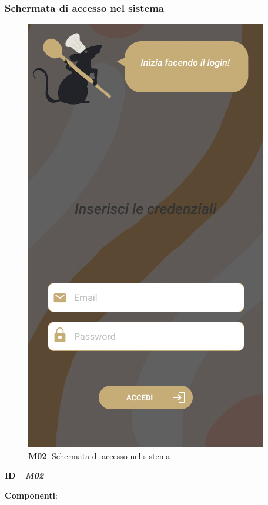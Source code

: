         \subsubsection{Schermata di accesso nel sistema}
            \begin{figure}[H]
                \centering
                \includegraphics[scale=0.5]{assets/diagrammi/Mockup/Mockup_Accesso.png}
                \caption{\textbf{M02}: Schermata di accesso nel sistema}\label{fig:Mockup_Login}
            \end{figure}
            \begin{flushleft}
                \textbf{ID} \ \Large{ \emph{\textbf{M02}}}\\
            \end{flushleft}

            \textbf{Componenti}:

